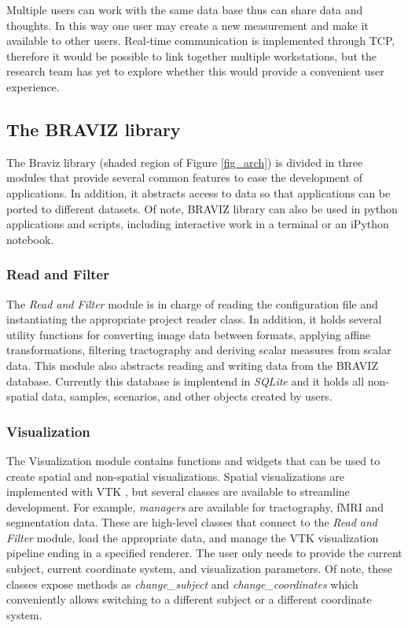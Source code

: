 \documentclass{frontiersHLTH}
\begin{document}
Multiple users can work with the same data base thus can share data and thoughts. In this way one user may create a new measurement and make it available to other users. Real-time communication is implemented through TCP, therefore it would be possible to link together multiple workstations, but the research team has yet to explore whether this would provide a convenient user experience.

\subsection{The BRAVIZ library}

\label{braviz_lib}
The Braviz library (shaded region of Figure \ref{fig_arch}) is divided in three modules that provide several common features to ease the development of applications. In addition, it abstracts access to data so that applications can be ported to different datasets. Of note, BRAVIZ library can also be used in python applications and scripts, including interactive work in a terminal or an iPython notebook.

\subsubsection{Read and Filter}

The \emph{Read and Filter} module is in charge of reading the configuration file and instantiating the appropriate project reader class. In addition, it holds several utility functions for converting image data between formats, applying affine transformations, filtering tractography and deriving scalar measures from scalar data. This module also abstracts reading and writing data from the BRAVIZ database. Currently this database is implentend in \emph{SQLite} \cite{hipp_sqlite_2015} and it holds all non-spatial data, samples, scenarios, and other objects created by users.

\subsubsection{Visualization}

The Visualization module contains functions and widgets that can be used to create spatial and non-spatial visualizations. Spatial visualizations are implemented with VTK \cite{schroeder_design_1996} , but several classes are available to streamline development. For example, \emph{managers} are available for tractography, fMRI and segmentation data. These are high-level classes that connect to the \emph{Read and Filter} module, load the appropriate data, and manage the VTK visualization pipeline ending in a specified renderer. The user only needs to provide the current subject, current coordinate system, and visualization parameters. 
Of note, these classes expose methods as \emph{change\_subject} and \emph{change\_coordinates} which conveniently allows switching to a different subject or a different coordinate system.
\end{document}
